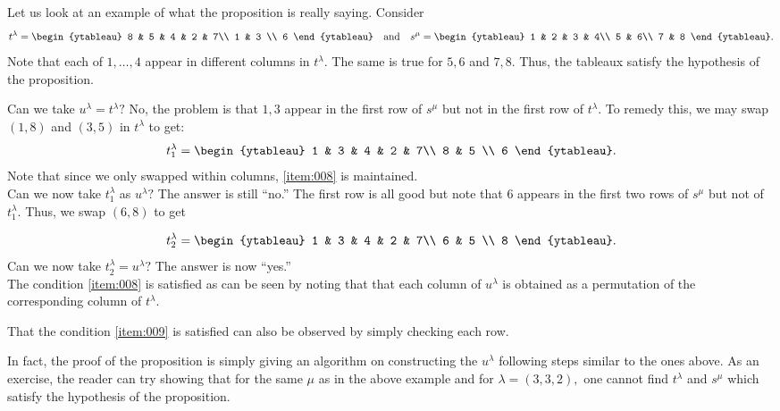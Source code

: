 \begin{ex}
	Let us look at an example of what the proposition is really saying. Consider
	\begin{equation*} 
		t^\lambda = \begin{ytableau}
			8 & 5 & 4 & 2 & 7\\
			1 & 3 \\
			6
		\end{ytableau}
		\andd
		s^\mu = \begin{ytableau}
			1 & 2 & 3 & 4\\
			5 & 6\\
			7 & 8
		\end{ytableau}.
	\end{equation*}
	Note that each of $1, \ldots, 4$ appear in different columns in $t^\lambda.$ The same is true for $5, 6$ and $7, 8.$ Thus, the tableaux satisfy the hypothesis of the proposition.

	Can we take $u^\lambda = t^\lambda?$ No, the problem is that $1, 3$ appear in the first row of $s^\mu$ but not in the first row of $t^\lambda.$ To remedy this, we may swap $(1, 8)$ and $(3, 5)$ in $t^\lambda$ to get:
	\begin{equation*} 
		t_1^\lambda = \begin{ytableau}
			1 & 3 & 4 & 2 & 7\\
			8 & 5 \\
			6
		\end{ytableau}.
	\end{equation*}
	Note that since we only swapped within columns, \ref{item:008} is maintained.\\
	Can we now take $t_1^\lambda$ as $u^\lambda?$ The answer is still ``no.'' The first row is all good but note that $6$ appears in the first two rows of $s^\mu$ but not of $t_1^\lambda.$ Thus, we swap $(6, 8)$ to get

	\begin{equation*} 
		t_2^\lambda = \begin{ytableau}
			1 & 3 & 4 & 2 & 7\\
			6 & 5 \\
			8
		\end{ytableau}.
	\end{equation*}
	Can we now take $t_2^\lambda = u^\lambda?$ The answer is now ``yes.'' \\
	The condition \ref{item:008} is satisfied as can be seen by noting that that each column of $u^\lambda$ is obtained as a permutation of the corresponding column of $t^\lambda.$

	That the condition \ref{item:009} is satisfied can also be observed by simply checking each row.
\end{ex}
In fact, the proof of the proposition is simply giving an algorithm on constructing the $u^\lambda$ following steps similar to the ones above. As an exercise, the reader can try showing that for the same $\mu$ as in the above example and for $\lambda = (3, 3, 2),$ one cannot find $t^\lambda$ and $s^\mu$ which satisfy the hypothesis of the proposition.

